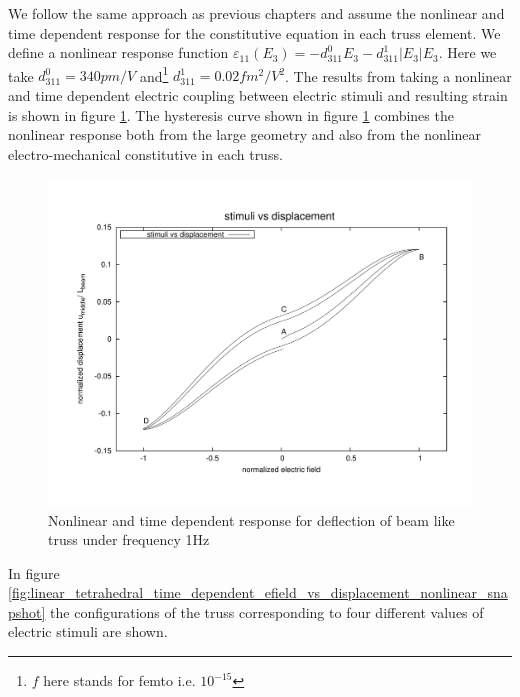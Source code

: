 We follow the same approach as previous chapters and assume the nonlinear and time dependent response for the constitutive equation in each truss element.
We define a nonlinear response function $\varepsilon_{11}(E_3)=-d_{311}^0 E_3-d_{311}^1 |E_3| E_3$.
Here we take $d_{311}^0=340pm/V$ and\footnote{$f$ here stands for femto i.e. $10^{-15}$ } $d_{311}^1=0.02 fm^2/V^2 $.
The results from taking a nonlinear and time dependent electric coupling between electric stimuli and resulting strain is shown in figure \ref{fig:linear_tetrahedral_time_dependent_efield_vs_displacement_nonlinear}.
The hysteresis curve shown in figure \ref{fig:linear_tetrahedral_time_dependent_efield_vs_displacement_nonlinear} combines the nonlinear response both from the large geometry and also from the nonlinear electro-mechanical constitutive in each truss. 
\begin{figure}   
\centering
\includegraphics[width=6.0in]{./chap_5_active_trusses/images_non_linear_time_dependent_constitutive_equatio/linear_tetrahedral_time_dependent_efield_vs_displacement_nonlinear.pdf}
\caption{Nonlinear and time dependent response for deflection of beam like truss under frequency 1Hz}
\label{fig:linear_tetrahedral_time_dependent_efield_vs_displacement_nonlinear}
\end{figure} 
In figure \ref{fig:linear_tetrahedral_time_dependent_efield_vs_displacement_nonlinear_snapshot} the configurations of the truss corresponding to four different values of electric stimuli are shown. 


